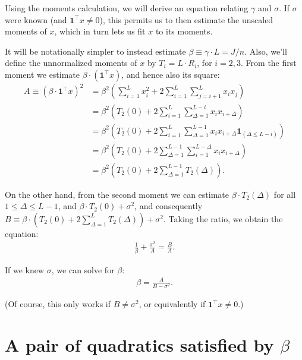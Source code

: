 \documentclass{article}
\theoremstyle{thm}
\theoremstyle{definition}
\newcommand{\1}{\mathbf{1}}
\begin{document}
Using the moments calculation, we will derive an equation relating $\gamma$ and $\sigma$. If $\sigma$ were known (and $\1^\top x \ne 0$), this permits us to then estimate the unscaled moments of $x$, which in turn lets us fit $x$ to its moments.

It will be notationally simpler to instead estimate $\beta \equiv \gamma \cdot L = J / n$. Also, we'll define the unnormalized moments of $x$ by $T_i = L \cdot R_i$, for $i=2,3$. From the first moment we estimate $\beta \cdot (\1^\top x)$, and hence also its square:
%
\begin{align}
%
    A \equiv (\beta \cdot \1^\top x)^2 
    &= \beta^2  \left( \sum_{i=1}^L x_i^2 + 2 \sum_{i=1}^L \sum_{j=i+1}^{L} x_i x_j \right)
        \nonumber \\
    &= \beta^2 \left( T_2(0) 
            + 2 \sum_{i=1}^{L} \sum_{\Delta=1}^{L-i} x_i x_{i+\Delta}\right)
        \nonumber \\
    &= \beta^2 \left( T_2(0) + 2 \sum_{i=1}^L \sum_{\Delta=1}^{L-1}x_i x_{i+\Delta} 
        \1_{(\Delta \le L-i)} \right)
        \nonumber \\
    &= \beta^2 \left( T_2(0) + 2 \sum_{\Delta=1}^{L-1} \sum_{i=1}^{L-\Delta}x_i x_{i+\Delta} 
        \right)
        \nonumber \\
    &= \beta^2 \left( T_2(0) + 2 \sum_{\Delta=1}^{L-1} T_2(\Delta) \right).
%
\end{align}

On the other hand, from the second moment we can estimate $\beta \cdot T_2(\Delta)$ for all $1 \le \Delta \le L-1$, and $\beta\cdot T_2(0) + \sigma^2$, and consequently $B \equiv \beta \cdot (T_2(0) + 2 \sum_{\Delta=1}^L T_2(\Delta)) + \sigma^2$. Taking the ratio, we obtain the equation:
%
\begin{align}
%
    \frac{1}{\beta} + \frac{\sigma^2}{A} = \frac{B}{A}.
%
\end{align}

If we knew $\sigma$, we can solve for $\beta$:
%
\begin{align}
%
    \beta = \frac{A}{B - \sigma^2}.
%
\end{align}

(Of course, this only works if $B \ne \sigma^2$, or equivalently if $\1^\top x \ne 0$.)

%
%
%
%

\section{A pair of quadratics satisfied by $\beta$}
\end{document}
